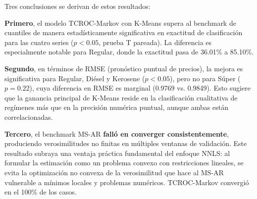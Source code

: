 \begin{table}[H]
\centering
\caption{Evaluación final del desempeño predictivo y significancia estadística.}
\label{tab:desempeno_final}
\end{table}

Tres conclusiones se derivan de estos resultados:

\textbf{Primero}, el modelo TCROC-Markov con K-Means supera al
benchmark de cuantiles de manera estadísticamente significativa en
exactitud de clasificación para las cuatro series ($p < 0.05$,
prueba T pareada).  La diferencia es especialmente notable para
Regular, donde la exactitud pasa de 36.01\% a 85.10\%.

\textbf{Segundo}, en términos de RMSE (pronóstico puntual de
precios), la mejora es significativa para Regular, Diésel y Kerosene
($p < 0.05$), pero no para Súper ($p = 0.22$), cuya diferencia en
RMSE es marginal (0.9769 vs. 0.9849).  Esto sugiere que la ganancia
principal de K-Means reside en la clasificación cualitativa de
regímenes más que en la precisión numérica puntual, aunque ambas
están correlacionadas.

\textbf{Tercero}, el benchmark MS-AR \textbf{falló en converger
consistentemente}, produciendo verosimilitudes no finitas en múltiples
ventanas de validación.  Este resultado subraya una ventaja práctica
fundamental del enfoque NNLS: al formular la estimación como un
problema convexo con restricciones lineales, se evita la optimización
no convexa de la verosimilitud que hace al MS-AR vulnerable a mínimos
locales y problemas numéricos.  TCROC-Markov convergió en el 100\%
de los casos.

